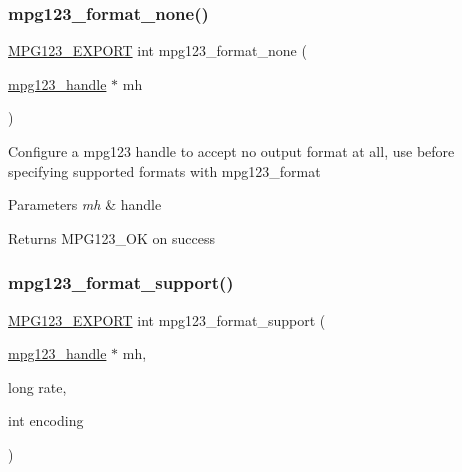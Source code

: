 \subsubsection{\texorpdfstring{mpg123\_format\_none()}{mpg123\_format\_none()}}
{\footnotesize\ttfamily \mbox{\hyperlink{mpg123_8h_a2ba98cfba3f760879df70e755b2a61cc}{M\+P\+G123\+\_\+\+E\+X\+P\+O\+RT}} int mpg123\+\_\+format\+\_\+none (\begin{DoxyParamCaption}\item[{\mbox{\hyperlink{group__mpg123__init_ga6728e2839a395f3a07d4514da659faca}{mpg123\+\_\+handle}} $\ast$}]{mh }\end{DoxyParamCaption})}

Configure a mpg123 handle to accept no output format at all, use before specifying supported formats with mpg123\+\_\+format 
\begin{DoxyParams}{Parameters}
{\em mh} & handle \\
\hline
\end{DoxyParams}
\begin{DoxyReturn}{Returns}
M\+P\+G123\+\_\+\+OK on success 
\end{DoxyReturn}
\mbox{\label{group__mpg123__output_gae30accfd052c88aad47820c5bb149cda}} 
\subsubsection{\texorpdfstring{mpg123\_format\_support()}{mpg123\_format\_support()}}
{\footnotesize\ttfamily \mbox{\hyperlink{mpg123_8h_a2ba98cfba3f760879df70e755b2a61cc}{M\+P\+G123\+\_\+\+E\+X\+P\+O\+RT}} int mpg123\+\_\+format\+\_\+support (\begin{DoxyParamCaption}\item[{\mbox{\hyperlink{group__mpg123__init_ga6728e2839a395f3a07d4514da659faca}{mpg123\+\_\+handle}} $\ast$}]{mh,  }\item[{long}]{rate,  }\item[{int}]{encoding }\end{DoxyParamCaption})}

